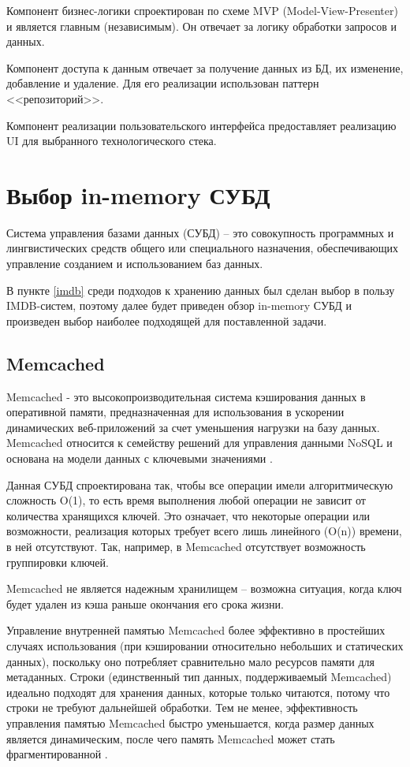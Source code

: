 Компонент бизнес-логики спроектирован по схеме MVP (Model-View-Presenter) и является главным (независимым). Он отвечает за логику обработки запросов и данных.

Компонент доступа к данным отвечает за получение данных из БД, их изменение, добавление и удаление. Для его реализации использован паттерн <<репозиторий>>. 

Компонент реализации пользовательского интерфейса предоставляет реализацию UI для выбранного технологического стека.


\section{Выбор in-memory СУБД}


Система управления базами данных (СУБД) -- это совокупность программных и лингвистических средств общего или специального назначения, обеспечивающих управление созданием и использованием баз данных\cite{database}.

В пункте \ref{imdb} среди подходов к хранению данных был сделан выбор в пользу IMDB-систем, поэтому далее будет приведен обзор in-memory СУБД и произведен выбор наиболее подходящей для поставленной задачи.




\subsection{Memcached}

Memcached - это высокопроизводительная система кэширования данных в оперативной памяти, предназначенная для использования в ускорении динамических веб-приложений за счет уменьшения нагрузки на базу данных. Memcached относится к семейству решений для управления данными NoSQL и основана на модели данных с ключевыми значениями  \cite{memcash}. 

Данная СУБД спроектирована так, чтобы все операции имели алгоритмическую сложность O(1), то есть время выполнения любой операции не зависит от количества хранящихся ключей. Это означает, что некоторые операции или возможности, реализация которых требует всего лишь линейного (O(n)) времени, в ней отсутствуют. Так, например, в Memcached отсутствует возможность группировки ключей.


Memcached не является надежным хранилищем – возможна ситуация, когда ключ будет удален из кэша раньше окончания его срока жизни. 

Управление внутренней памятью Memcached более эффективно в простейших случаях использования (при кэшировании относительно небольших и статических данных), поскольку оно потребляет сравнительно мало ресурсов памяти для метаданных. Строки (единственный тип данных, поддерживаемый Memcached) идеально подходят для хранения данных, которые только читаются, потому что строки не требуют дальнейшей обработки. Тем не менее, эффективность управления памятью Memcached быстро уменьшается, когда размер данных является динамическим, после чего память Memcached может стать фрагментированной \cite{memcash2}. 

